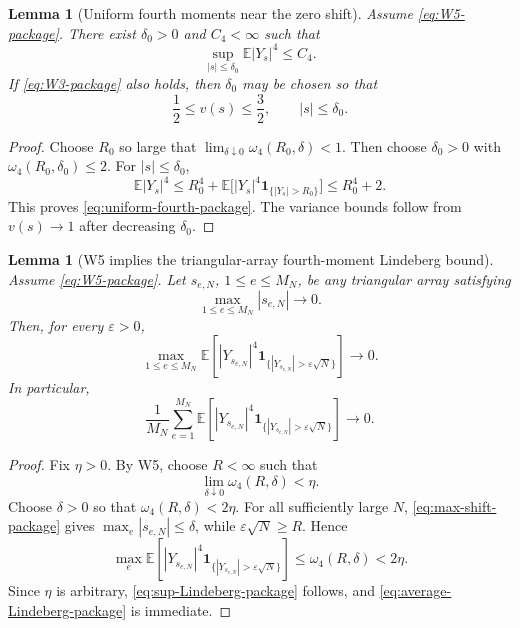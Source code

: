 \documentclass[11pt]{article}
\newtheorem{lemma}[theorem]{Lemma}
\theoremstyle{definition}
\theoremstyle{remark}
\newcommand{\E}{\mathbb E}
\newcommand{\one}{\mathbf 1}
\begin{document}
\begin{lemma}[Uniform fourth moments near the zero shift]
\label{lem:uniform-fourth-package}
Assume \eqref{eq:W5-package}.  There exist \(\delta_0>0\) and
\(C_4<\infty\) such that
\begin{equation}\label{eq:uniform-fourth-package}
 \sup_{|s|\le\delta_0}\E|Y_s|^4\le C_4.
\end{equation}
If \eqref{eq:W3-package} also holds, then \(\delta_0\) may be chosen so that
\begin{equation}\label{eq:uniform-variance-package}
 \frac12\le v(s)\le\frac32,
 \qquad |s|\le\delta_0.
\end{equation}
\end{lemma}

\begin{proof}
Choose \(R_0\) so large that
\(
 \lim_{\delta\downarrow0}\omega_4(R_0,\delta)<1.
\)
Then choose \(\delta_0>0\) with
\(\omega_4(R_0,\delta_0)\le2\).  For \(|s|\le\delta_0\),
\[
 \E|Y_s|^4
 \le R_0^4+
 \E\bigl[|Y_s|^4\one_{\{|Y_s|>R_0\}}\bigr]
 \le R_0^4+2.
\]
This proves \eqref{eq:uniform-fourth-package}.  The variance bounds follow
from \(v(s)\to1\) after decreasing \(\delta_0\).
\end{proof}

\begin{lemma}[W5 implies the triangular-array fourth-moment Lindeberg bound]
\label{lem:exact-W5-Lindeberg-package}
Assume \eqref{eq:W5-package}.  Let \(s_{e,N}\), \(1\le e\le M_N\), be any
triangular array satisfying
\begin{equation}\label{eq:max-shift-package}
 \max_{1\le e\le M_N}|s_{e,N}|\longrightarrow0.
\end{equation}
Then, for every \(\varepsilon>0\),
\begin{equation}\label{eq:sup-Lindeberg-package}
 \max_{1\le e\le M_N}
 \E\left[
 |Y_{s_{e,N}}|^4
 \one_{\{|Y_{s_{e,N}}|>\varepsilon\sqrt N\}}
 \right]
 \longrightarrow0.
\end{equation}
In particular,
\begin{equation}\label{eq:average-Lindeberg-package}
 \frac1{M_N}\sum_{e=1}^{M_N}
 \E\left[
 |Y_{s_{e,N}}|^4
 \one_{\{|Y_{s_{e,N}}|>\varepsilon\sqrt N\}}
 \right]
 \longrightarrow0.
\end{equation}
\end{lemma}

\begin{proof}
Fix \(\eta>0\).  By W5, choose \(R<\infty\) such that
\[
 \lim_{\delta\downarrow0}\omega_4(R,\delta)<\eta.
\]
Choose \(\delta>0\) so that \(\omega_4(R,\delta)<2\eta\).  For all
sufficiently large \(N\), \eqref{eq:max-shift-package} gives
\(\max_e|s_{e,N}|\le\delta\), while
\(\varepsilon\sqrt N\ge R\).  Hence
\[
 \max_e\E\left[
 |Y_{s_{e,N}}|^4
 \one_{\{|Y_{s_{e,N}}|>\varepsilon\sqrt N\}}
 \right]
 \le\omega_4(R,\delta)<2\eta.
\]
Since \(\eta\) is arbitrary, \eqref{eq:sup-Lindeberg-package} follows, and
\eqref{eq:average-Lindeberg-package} is immediate.
\end{proof}
\end{document}
